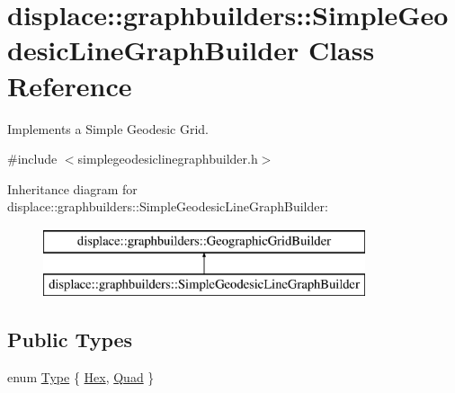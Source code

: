 \hypertarget{classdisplace_1_1graphbuilders_1_1_simple_geodesic_line_graph_builder}{}\section{displace\+::graphbuilders\+::Simple\+Geodesic\+Line\+Graph\+Builder Class Reference}
\label{classdisplace_1_1graphbuilders_1_1_simple_geodesic_line_graph_builder}


Implements a Simple Geodesic Grid.  




{\ttfamily \#include $<$simplegeodesiclinegraphbuilder.\+h$>$}

Inheritance diagram for displace\+::graphbuilders\+::Simple\+Geodesic\+Line\+Graph\+Builder\+:\begin{figure}[H]
\begin{center}
\leavevmode
\includegraphics[height=2.000000cm]{d1/d52/classdisplace_1_1graphbuilders_1_1_simple_geodesic_line_graph_builder}
\end{center}
\end{figure}
\subsection*{Public Types}
\begin{DoxyCompactItemize}
\item 
enum \mbox{\hyperlink{classdisplace_1_1graphbuilders_1_1_simple_geodesic_line_graph_builder_a992a295d1a98448230c6402d901933c7}{Type}} \{ \mbox{\hyperlink{classdisplace_1_1graphbuilders_1_1_simple_geodesic_line_graph_builder_a992a295d1a98448230c6402d901933c7ac49d9928d1dbbe163cda55885c8b25ab}{Hex}}, 
\mbox{\hyperlink{classdisplace_1_1graphbuilders_1_1_simple_geodesic_line_graph_builder_a992a295d1a98448230c6402d901933c7a89af8505c759d2aeecc5b85de5f35be9}{Quad}}
 \}
\end{DoxyCompactItemize}
